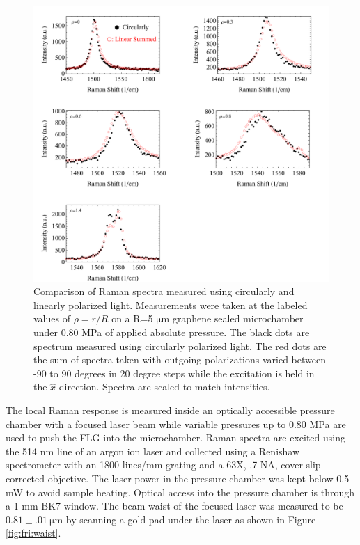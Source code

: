 \begin{figure}
	\begin{center}
	\includegraphics[scale=.75]{Figs_Friction/LinearvsCircular.pdf}
	\end{center}
	\caption[A comparison of Raman spectra measured using circularly and linearly polarized light]{\label{fig:fri:circlelinear}Comparison of Raman spectra measured using circularly and linearly polarized light. Measurements were taken at the labeled values of $\rho=r/R$ on a R=5 $\mathrm{\mu}$m graphene sealed microchamber under 0.80 MPa of applied absolute pressure. The black dots are spectrum measured using circularly polarized light. The red dots are the sum of spectra taken with outgoing polarizations varied between -90 to 90 degrees in 20 degree steps while the excitation is held in the $\hat x$ direction. Spectra are scaled to match intensities.}
\end{figure}

The local Raman response is measured inside an optically accessible pressure chamber with a focused laser beam while variable pressures up to 0.80 MPa are used to push the FLG into the microchamber.
Raman spectra are excited using the 514 nm line of an argon ion laser and collected using a Renishaw spectrometer with an 1800 lines/mm grating and a 63X, .7 NA, cover slip corrected objective.
The laser power in the pressure chamber was kept below 0.5 mW to avoid sample heating.
Optical access into the pressure chamber is through a 1 mm BK7 window.
The beam waist of the focused laser was measured to be $0.81 \pm .01 \ \mathrm{\mu m}$ by scanning a gold pad under the laser as shown in Figure \ref{fig:fri:waist}.

